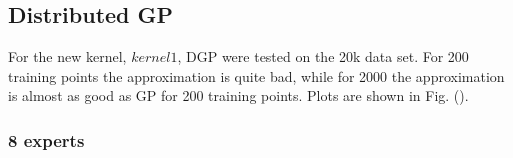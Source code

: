 \documentclass[twoside,english]{uiofysmaster}
\begin{document}
\subsection{Distributed GP}
 
For the new kernel, $kernel1$, DGP were tested on the 20k data set. For 200 training points the approximation is quite bad, while for 2000 the approximation is almost as good as GP for 200 training points. Plots are shown in Fig. ().
 
 \subsubsection{8 experts}
 
 
 
\end{document}
